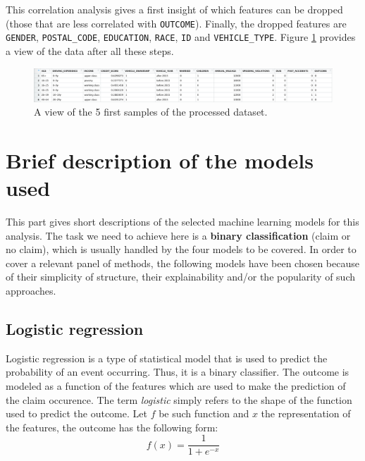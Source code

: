 \documentclass[a4paper,11pt, titlepage]{article}
\begin{document}
\noindent This correlation analysis gives a first insight of which features can be dropped (those that are less correlated with {\tt OUTCOME}). Finally, the dropped features are {\tt GENDER}, {\tt POSTAL\_CODE}, {\tt EDUCATION}, {\tt RACE}, {\tt ID} and {\tt VEHICLE\_TYPE}. Figure \ref{fig:head-data} provides a view of the data after all these steps.\newline

\begin{figure}[h!]
    \centering
    \includegraphics[width=\textwidth]{head-data.png}
    \caption{A view of the 5 first samples of the processed dataset.}
    \label{fig:head-data}
\end{figure}


\section{Brief description of the models used} \label{models}

This part gives short descriptions of the selected machine learning models for this analysis. The task we need to achieve here is a \textbf{binary classification} (claim or no claim), which is usually handled by the four models to be covered. In order to cover a relevant panel of methods, the following models have been chosen because of their simplicity of structure, their explainability and/or the popularity of such approaches.

\subsection{Logistic regression}

Logistic regression is a type of statistical model that is used to predict the probability of an event occurring. Thus, it is a binary classifier. The outcome is modeled as a function of the features which are used to make the prediction of the claim occurence. The term \textsl{logistic} simply refers to the shape of the function used to predict the outcome. Let $f$ be such function and $x$ the representation of the features, the outcome has the following form:
\begin{equation*}
    f(x) = \dfrac{1}{1+e^{-x}}
\end{equation*}
\end{document}

